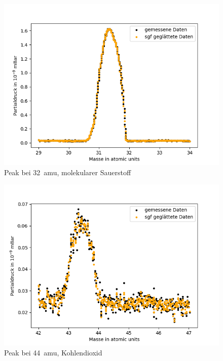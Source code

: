 \begin{figure}
    \centering
    \includegraphics[width=140mm,scale=0.8]{Massenspektrometer/include/MSm32O2.png}
    \caption{Peak bei \SI{32}{amu}, molekularer Sauerstoff}
    \label{fig:MSO2Peak}
\end{figure}
\begin{figure}
    \centering
    \includegraphics[width=140mm,scale=0.8]{Massenspektrometer/include/MSm44CO2.png}
    \caption{Peak bei \SI{44}{amu}, Kohlendioxid}
    \label{fig:MSCO2Peak}
\end{figure}
